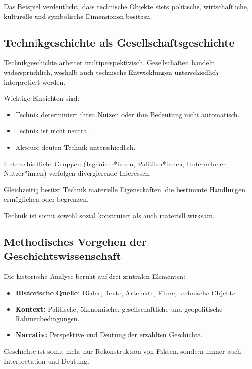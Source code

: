Das Beispiel verdeutlicht, dass technische Objekte stets politische, wirtschaftliche, 
kulturelle und symbolische Dimensionen besitzen.

\subsection{Technikgeschichte als Gesellschaftsgeschichte}

Technikgeschichte arbeitet multiperspektivisch. 
Gesellschaften handeln widersprüchlich, weshalb auch technische Entwicklungen 
unterschiedlich interpretiert werden.

Wichtige Einsichten sind:

\begin{itemize}
    \item Technik determiniert ihren Nutzen oder ihre Bedeutung nicht automatisch.
    \item Technik ist nicht neutral.
    \item Akteure deuten Technik unterschiedlich.
\end{itemize}

Unterschiedliche Gruppen (Ingenieur*innen, Politiker*innen, Unternehmen, Nutzer*innen) 
verfolgen divergierende Interessen. 

Gleichzeitig besitzt Technik materielle Eigenschaften, die bestimmte Handlungen 
ermöglichen oder begrenzen. 

Technik ist somit sowohl sozial konstruiert als auch materiell wirksam.

\subsection{Methodisches Vorgehen der Geschichtswissenschaft}

Die historische Analyse beruht auf drei zentralen Elementen:

\begin{itemize}
    \item \textbf{Historische Quelle:} Bilder, Texte, Artefakte, Filme, technische Objekte.
    \item \textbf{Kontext:} Politische, ökonomische, gesellschaftliche und geopolitische Rahmenbedingungen.
    \item \textbf{Narrativ:} Perspektive und Deutung der erzählten Geschichte.
\end{itemize}

Geschichte ist somit nicht nur Rekonstruktion von Fakten, sondern immer auch 
Interpretation und Deutung.

